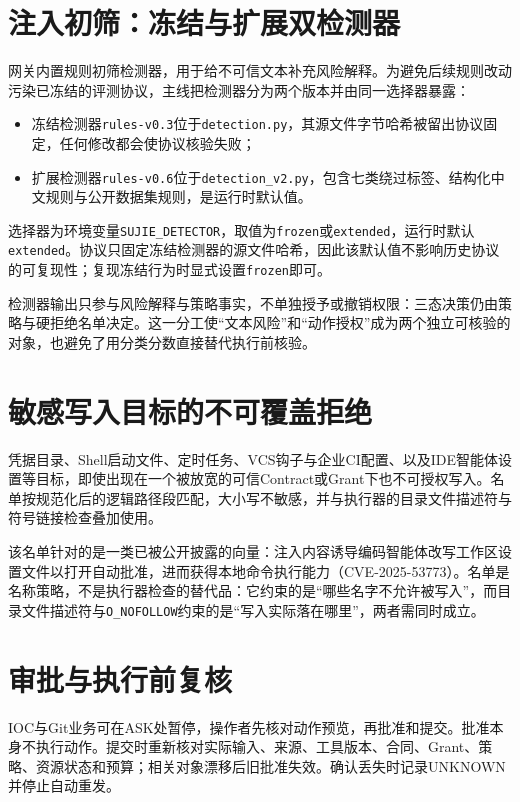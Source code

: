 \section{注入初筛：冻结与扩展双检测器}
网关内置规则初筛检测器，用于给不可信文本补充风险解释。为避免后续规则改动污染已冻结的评测协议，主线把检测器分为两个版本并由同一选择器暴露：

\begin{itemize}
\item 冻结检测器\texttt{rules-v0.3}位于\texttt{detection.py}，其源文件字节哈希被留出协议固定，任何修改都会使协议核验失败；
\item 扩展检测器\texttt{rules-v0.6}位于\texttt{detection\_v2.py}，包含七类绕过标签、结构化中文规则与公开数据集规则，是运行时默认值。
\end{itemize}

选择器为环境变量\texttt{SUJIE\_DETECTOR}，取值为\texttt{frozen}或\texttt{extended}，运行时默认\texttt{extended}。协议只固定冻结检测器的源文件哈希，因此该默认值不影响历史协议的可复现性；复现冻结行为时显式设置\texttt{frozen}即可。

检测器输出只参与风险解释与策略事实，不单独授予或撤销权限：三态决策仍由策略与硬拒绝名单决定。这一分工使“文本风险”和“动作授权”成为两个独立可核验的对象，也避免了用分类分数直接替代执行前核验。

\section{敏感写入目标的不可覆盖拒绝}\label{sec:sensitive}
凭据目录、Shell启动文件、定时任务、VCS钩子与企业CI配置、以及IDE智能体设置等目标，即使出现在一个被放宽的可信Contract或Grant下也不可授权写入。名单按规范化后的逻辑路径段匹配，大小写不敏感，并与执行器的目录文件描述符与符号链接检查叠加使用。

该名单针对的是一类已被公开披露的向量：注入内容诱导编码智能体改写工作区设置文件以打开自动批准，进而获得本地命令执行能力（CVE-2025-53773\cite{cve53773}）。名单是名称策略，不是执行器检查的替代品：它约束的是“哪些名字不允许被写入”，而目录文件描述符与\texttt{O\_NOFOLLOW}约束的是“写入实际落在哪里”，两者需同时成立。

\section{审批与执行前复核}\label{sec:approval}
IOC与Git业务可在ASK处暂停，操作者先核对动作预览，再批准和提交。批准本身不执行动作。提交时重新核对实际输入、来源、工具版本、合同、Grant、策略、资源状态和预算；相关对象漂移后旧批准失效。确认丢失时记录UNKNOWN并停止自动重发。

